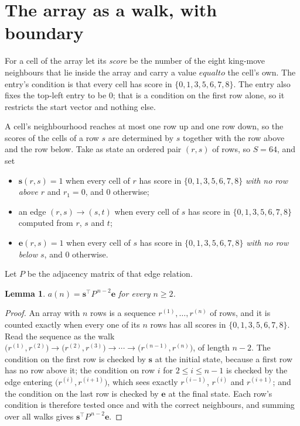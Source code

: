 \documentclass[11pt,a4paper]{article}
\theoremstyle{plain}
\newtheorem{lemma}[theorem]{Lemma}
\theoremstyle{definition}
\begin{document}
\section{The array as a walk, with boundary}

For a cell of the array let its \emph{score} be the number of the eight king-move neighbours that lie inside
the array and carry a value $equal to$ the cell's own. The entry's condition is that every cell
has score in $\{0,1,3,5,6,7,8\}$. The entry also fixes the top-left entry to be $0$; that is a condition on the first row alone, so it restricts the start vector and nothing else.

A cell's neighbourhood reaches at most one row up and one row down, so the scores of the
cells of a row $s$ are determined by $s$ together with the row above and the row below.
Take as state an ordered pair $(r,s)$ of rows, so $S=64$, and set
\begin{itemize}
\item $\mathbf{s}(r,s)=1$ when every cell of $r$ has score in $\{0,1,3,5,6,7,8\}$ \emph{with no row
above $r$} and $r_1=0$, and $0$ otherwise;
\item an edge $(r,s)\to(s,t)$ when every cell of $s$ has score in $\{0,1,3,5,6,7,8\}$ computed from
$r$, $s$ and $t$;
\item $\mathbf{e}(r,s)=1$ when every cell of $s$ has score in $\{0,1,3,5,6,7,8\}$ \emph{with no row
below $s$}, and $0$ otherwise.
\end{itemize}
Let $P$ be the adjacency matrix of that edge relation.

\begin{lemma}\label{lem:walk}
$a(n)=\mathbf{s}^{\!\top}P^{\,n-2}\mathbf{e}$ for every $n\ge2$.
\end{lemma}

\begin{proof}
An array with $n$ rows is a sequence $r^{(1)},\dots,r^{(n)}$ of rows, and it is counted
exactly when every one of its $n$ rows has all scores in $\{0,1,3,5,6,7,8\}$. Read the sequence as the
walk $\bigl(r^{(1)},r^{(2)}\bigr)\to\bigl(r^{(2)},r^{(3)}\bigr)\to\cdots\to
\bigl(r^{(n-1)},r^{(n)}\bigr)$, of length $n-2$. The condition on the first row is
checked by $\mathbf{s}$ at the initial state, because a first row has no row above it; the
condition on row $i$ for $2\le i\le n-1$ is checked by the edge entering
$\bigl(r^{(i)},r^{(i+1)}\bigr)$, which sees exactly $r^{(i-1)}$, $r^{(i)}$ and
$r^{(i+1)}$; and the condition on the last row is checked by $\mathbf{e}$ at the final
state. Each row's condition is therefore tested once and with the correct neighbours, and
summing over all walks gives $\mathbf{s}^{\!\top}P^{\,n-2}\mathbf{e}$.
\end{proof}
\end{document}
